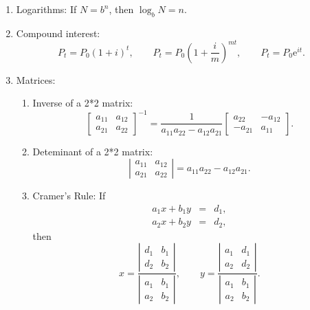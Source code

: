 \begin{enumerate}
	\item Logarithms: If $N=b^{n}$, then $\log _{b}N=n.$
	
	\item Compound interest:%
	\begin{equation*}
	P_{t}=P_{0}\left( 1+i\right) ^{t},\qquad P_{t}=P_{0}\left( 1+\frac{i}{m}%
	\right) ^{mt},\qquad P_{t}=P_{0}\mathrm{e}^{it}.
	\end{equation*}
	
	\item Matrices:
	
	\begin{enumerate}
		\item Inverse of a 2*2 matrix:
		\begin{equation*}
		\left[
		\begin{array}{cc}
		a_{11} & a_{12} \\
		a_{21} & a_{22}%
		\end{array}%
		\right] ^{-1}=\frac{1}{a_{11}a_{22}-a_{12}a_{21}}\left[
		\begin{array}{cc}
		a_{22} & -a_{12} \\
		-a_{21} & a_{11}%
		\end{array}%
		\right] .
		\end{equation*}
		
		\item Deteminant of a 2*2 matrix:
		\begin{equation*}
		\left\vert
		\begin{array}{cc}
		a_{11} & a_{12} \\
		a_{21} & a_{22}%
		\end{array}%
		\right\vert =a_{11}a_{22}-a_{12}a_{21}.
		\end{equation*}
		
		\item Cramer's Rule: If
		\begin{eqnarray*}
			a_{1}x+b_{1}y &=&d_{1}, \\
			a_{2}x+b_{2}y &=&d_{2},
		\end{eqnarray*}%
		then%
		\begin{equation*}
		x=\frac{\left\vert
			\begin{array}{cc}
			d_{1} & b_{1} \\
			d_{2} & b_{2}%
			\end{array}%
			\right\vert }{\left\vert
			\begin{array}{cc}
			a_{1} & b_{1} \\
			a_{2} & b_{2}%
			\end{array}%
			\right\vert },\qquad y=\frac{\left\vert
			\begin{array}{cc}
			a_{1} & d_{1} \\
			a_{2} & d_{2}%
			\end{array}%
			\right\vert }{\left\vert
			\begin{array}{cc}
			a_{1} & b_{1} \\
			a_{2} & b_{2}%
			\end{array}%
			\right\vert }.
		\end{equation*}
	\end{enumerate}
\end{enumerate}
